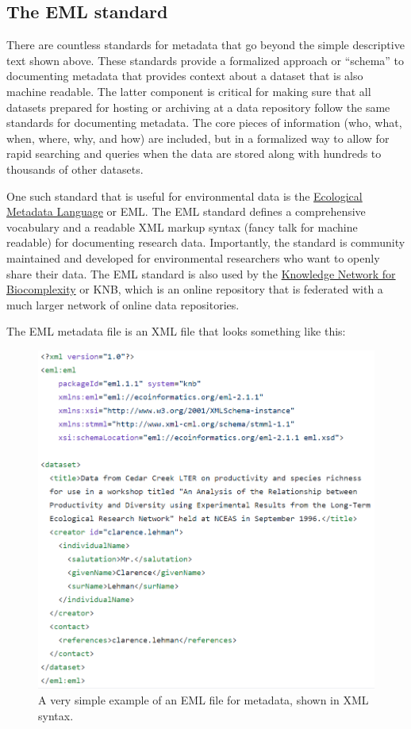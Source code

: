 \documentclass[
]{book}
\begin{document}
\hypertarget{eml}{%
\subsection{The EML standard}\label{eml}}

There are countless standards for metadata that go beyond the simple descriptive text shown above. These standards provide a formalized approach or ``schema'' to documenting metadata that provides context about a dataset that is also machine readable. The latter component is critical for making sure that all datasets prepared for hosting or archiving at a data repository follow the same standards for documenting metadata. The core pieces of information (who, what, when, where, why, and how) are included, but in a formalized way to allow for rapid searching and queries when the data are stored along with hundreds to thousands of other datasets.

One such standard that is useful for environmental data is the \href{https://eml.ecoinformatics.org/}{Ecological Metadata Language} or EML. The EML standard defines a comprehensive vocabulary and a readable XML markup syntax (fancy talk for machine readable) for documenting research data. Importantly, the standard is community maintained and developed for environmental researchers who want to openly share their data. The EML standard is also used by the \href{https://knb.ecoinformatics.org/}{Knowledge Network for Biocomplexity} or KNB, which is an online repository that is federated with a much larger network of online data repositories.

The EML metadata file is an XML file that looks something like this:

\begin{figure}

{\centering \includegraphics[width=0.7\linewidth]{img/emlsimple} 

}

\caption{A very simple example of an EML file for metadata, shown in XML syntax.}\label{fig:emlsimple}
\end{figure}
\end{document}
